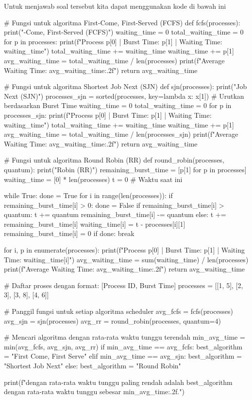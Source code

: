 \documentclass[12pt]{article}
\begin{document}
        \noindent Untuk menjawab soal tersebut kita dapat menggunakan kode di bawah ini
\begin{python}
# Fungsi untuk algoritma First-Come, First-Served (FCFS)
def fcfs(processes):
    print("\nFirst-Come, First-Served (FCFS)")
    waiting_time = 0
    total_waiting_time = 0
    for p in processes:
        print(f"Process {p[0]} | Burst Time: {p[1]} | Waiting Time: {waiting_time}")
        total_waiting_time += waiting_time
        waiting_time += p[1]
    avg_waiting_time = total_waiting_time / len(processes)
    print(f"Average Waiting Time: {avg_waiting_time:.2f}")
    return avg_waiting_time

# Fungsi untuk algoritma Shortest Job Next (SJN)
def sjn(processes):
    print("\nShortest Job Next (SJN)")
    processes_sjn = sorted(processes, key=lambda x: x[1])  # Urutkan berdasarkan Burst Time
    waiting_time = 0
    total_waiting_time = 0
    for p in processes_sjn:
        print(f"Process {p[0]} | Burst Time: {p[1]} | Waiting Time: {waiting_time}")
        total_waiting_time += waiting_time
        waiting_time += p[1]
    avg_waiting_time = total_waiting_time / len(processes_sjn)
    print(f"Average Waiting Time: {avg_waiting_time:.2f}")
    return avg_waiting_time

# Fungsi untuk algoritma Round Robin (RR)
def round_robin(processes, quantum):
    print("\nRound Robin (RR)")
    remaining_burst_time = [p[1] for p in processes]
    waiting_time = [0] * len(processes)
    t = 0  # Waktu saat ini

    while True:
        done = True
        for i in range(len(processes)):
            if remaining_burst_time[i] > 0:
                done = False
                if remaining_burst_time[i] > quantum:
                    t += quantum
                    remaining_burst_time[i] -= quantum
                else:
                    t += remaining_burst_time[i]
                    waiting_time[i] = t - processes[i][1]
                    remaining_burst_time[i] = 0
        if done:
            break

    for i, p in enumerate(processes):
        print(f"Process {p[0]} | Burst Time: {p[1]} | Waiting Time: {waiting_time[i]}")
    avg_waiting_time = sum(waiting_time) / len(processes)
    print(f"Average Waiting Time: {avg_waiting_time:.2f}")
    return avg_waiting_time

# Daftar proses dengan format: [Process ID, Burst Time]
processes = [[1, 5], [2, 3], [3, 8], [4, 6]]

# Panggil fungsi untuk setiap algoritma scheduler
avg_fcfs = fcfs(processes)
avg_sjn = sjn(processes)
avg_rr = round_robin(processes, quantum=4)

# Mencari algoritma dengan rata-rata waktu tunggu terendah
min_avg_time = min(avg_fcfs, avg_sjn, avg_rr)
if min_avg_time == avg_fcfs:
    best_algorithm = "First Come, First Serve"
elif min_avg_time == avg_sjn:
    best_algorithm = "Shortest Job Next"
else:
    best_algorithm = "Round Robin"

print(f"\nAlgoritma dengan rata-rata waktu tunggu paling rendah adalah {best_algorithm} dengan rata-rata waktu tunggu sebesar {min_avg_time:.2f}.")
\end{python}
\end{document}
